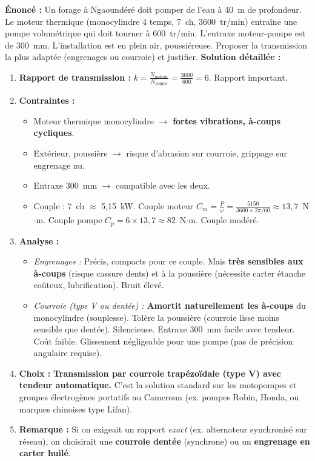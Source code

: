 \documentclass[11pt]{article}
\begin{document}
\begin{exoresolu}
\textbf{Énoncé :} Un forage à Ngaoundéré doit pomper de l'eau à 40~m de profondeur. Le moteur thermique (monocylindre 4 temps, 7~ch, 3600~tr/min) entraîne une pompe volumétrique qui doit tourner à 600~tr/min. L'entraxe moteur-pompe est de 300~mm. L'installation est en plein air, poussiéreuse. Proposer la transmission la plus adaptée (engrenages ou courroie) et justifier.
\tcblower
\textbf{Solution détaillée :}
\begin{enumerate}
    \item \textbf{Rapport de transmission :} $k = \frac{N_{\text{moteur}}}{N_{\text{pompe}}} = \frac{3600}{600} = 6$. Rapport important.
    \item \textbf{Contraintes :}
    \begin{itemize}
        \item Moteur thermique monocylindre $\rightarrow$ \textbf{fortes vibrations, à-coups cycliques}.
        \item Extérieur, poussière $\rightarrow$ risque d'abrasion sur courroie, grippage sur engrenage nu.
        \item Entraxe 300~mm $\rightarrow$ compatible avec les deux.
        \item Couple : 7~ch $\approx$ 5,15~kW. Couple moteur $C_m = \frac{P}{\omega} = \frac{5150}{3600 \times 2\pi/60} \approx 13,7$~N$\cdot$m. Couple pompe $C_p = 6 \times 13,7 \approx 82$~N$\cdot$m. Couple modéré.
    \end{itemize}
    \item \textbf{Analyse :}
    \begin{itemize}
        \item \emph{Engrenages :} Précis, compacts pour ce couple. Mais \textbf{très sensibles aux à-coups} (risque cassure dents) et à la poussière (nécessite carter étanche coûteux, lubrification). Bruit élevé.
        \item \emph{Courroie (type V ou dentée) :} \textbf{Amortit naturellement les à-coups} du monocylindre (souplesse). Tolère la poussière (courroie lisse moins sensible que dentée). Silencieuse. Entraxe 300~mm facile avec tendeur. Coût faible. Glissement négligeable pour une pompe (pas de précision angulaire requise).
    \end{itemize}
    \item \textbf{Choix :} \textbf{Transmission par courroie trapézoïdale (type V) avec tendeur automatique.} C'est la solution standard sur les motopompes et groupes électrogènes portatifs au Cameroun (ex. pompes Robin, Honda, ou marques chinoises type Lifan).
    \item \textbf{Remarque :} Si on exigeait un rapport \emph{exact} (ex. alternateur synchronisé sur réseau), on choisirait une \textbf{courroie dentée} (synchrone) ou un \textbf{engrenage en carter huilé}.
\end{enumerate}
\end{exoresolu}
\end{document}
